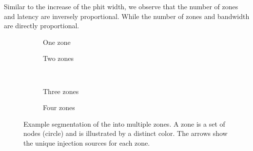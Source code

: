 Similar to the increase of the phit width, we observe that the number of zones and latency are inversely proportional. While the number of zones and bandwidth are directly proportional.

\begin{figure}[htbp]
    \centering
    \begin{subfigure}[b]{0.48\linewidth}
        \centering
        \begin{adjustbox}{width=0.6\linewidth}
            
        \end{adjustbox}
        \caption{One zone}
        \label{fig:segmentation_example_1}
    \end{subfigure}
    \hfill
    \begin{subfigure}[b]{0.48\linewidth}
        \centering
        \begin{adjustbox}{width=0.6\linewidth}
            
        \end{adjustbox}
        \caption{Two zones}
        \label{fig:segmentation_example_2}
    \end{subfigure}
    \\ \vspace{1.5em}
    \begin{subfigure}[b]{0.48\linewidth}
        \centering
        \begin{adjustbox}{width=0.6\linewidth}
            
        \end{adjustbox}
        \caption{Three zones}
        \label{fig:segmentation_example_3}
    \end{subfigure}
    \hfill
    \begin{subfigure}[b]{0.48\linewidth}
        \centering
        \begin{adjustbox}{width=0.6\linewidth}
            
        \end{adjustbox}
        \caption{Four zones}
        \label{fig:segmentation_example_4}
    \end{subfigure}
    \caption{
    Example segmentation of the \confignoc{} into multiple zones.
    A zone is a set of nodes (circle) and is illustrated by a distinct color.
    The arrows show the unique injection sources for each zone.
    }
    \label{fig:segmentation_example}
\end{figure}

